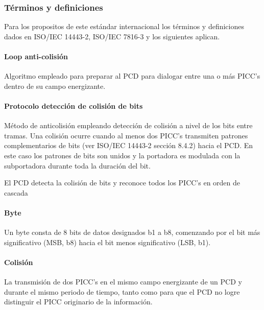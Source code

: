 \subsubsection{Términos y definiciones}
Para los propositos de este estándar internacional los términos y definiciones dados en ISO/IEC 14443-2, ISO/IEC 7816-3 y los siguientes aplican.\par

\paragraph{Loop anti-colisión}
Algoritmo empleado para preparar al PCD para dialogar entre una o más PICC’s dentro de su campo energizante.\par


\vspace{\baselineskip}
\paragraph{Protocolo detección de colisión de bits}
Método de anticolisión empleando detección de colisión a nivel de los bits entre tramas. Una colisión ocurre cuando al menos dos PICC’s transmiten patrones complementarios de bits (ver ISO/IEC 14443-2 sección 8.4.2) hacia el PCD. En este caso los patrones de bits son unidos y la portadora es modulada con la subportadora durante toda la duración del bit.\par

El PCD detecta la colisión de bits y reconoce todos los PICC’s en orden de cascada\par


\vspace{\baselineskip}
\paragraph{Byte}
Un byte consta de 8 bits de datos designados b1 a b8, comenzando por el bit más significativo (MSB, b8) hacia el bit menos significativo (LSB, b1).\par


\vspace{\baselineskip}
\paragraph{Colisión}
La transmisión de dos PICC’s en el mismo campo energizante de un PCD y durante el mismo periodo de tiempo, tanto como para que el PCD no logre distinguir el PICC originario de la información.\par


